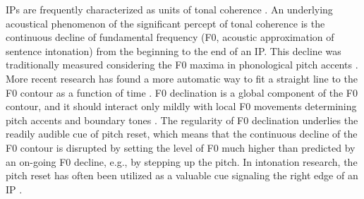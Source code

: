 \documentclass[output=paper]{langscibook}
\begin{document}
	IPs are frequently characterized as units of tonal coherence \citep[][]{duBoisEtAl1992, breenEtAl2012, buhmannEtAl2002, himmelmannEtAl2018}. An underlying acoustical phenomenon of the significant percept of tonal coherence is the continuous decline of fundamental frequency (F0, acoustic approximation of sentence intonation) from the beginning to the end of an IP. This decline was traditionally measured considering the F0 maxima in phonological pitch accents \citep[see, e.g.,][]{ladd1988, libermanPierr1984, pierrehumbert1979}. More recent research has found a more automatic way to fit a straight line to the F0 contour as a function of time \citep[][]{yuanLiberman2014}. F0 declination is a global component of the F0 contour, and it should interact only mildly with local F0 movements determining pitch accents and boundary tones \citep[][]{fujisaki1983, fujisakiHirose1982}. The regularity of F0 declination underlies the readily audible cue of pitch reset, which means that the continuous decline of the F0 contour is disrupted by setting the level of F0 much higher than predicted by an on-going F0 decline, e.g., by stepping up the pitch. In intonation research, the pitch reset has often been utilized as a valuable cue signaling the right edge of an IP \citep[][]{cooperSorensen1981, couperKuhlen2001, himmelmannEtAl2018, ladd1988, schuetzeCoburnEtAl1991, thorsen1985}.
	
\end{document}
